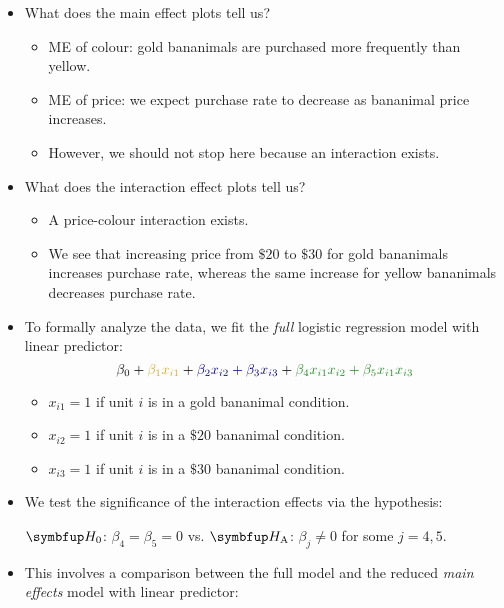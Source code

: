 \begin{itemize}
      \item What does the main effect plots tell us?
            \begin{itemize}
                  \item ME of colour: gold bananimals are purchased more frequently than yellow.
                  \item ME of price: we expect purchase rate to decrease as bananimal price increases.
                  \item However, we should not stop here because an interaction exists.
            \end{itemize}
      \item What does the interaction effect plots tell us?
            \begin{itemize}
                  \item A price-colour interaction exists.
                  \item We see that increasing price from $ \$20 $ to $ \$30 $ for gold bananimals increases purchase rate,
                        whereas the same increase for yellow bananimals decreases purchase rate.
            \end{itemize}
      \item To formally analyze the data, we fit the \emph{full} logistic regression model with linear predictor:
            \[ \beta_0+{\color{Goldenrod}\beta_1x_{i1}}+{\color{DarkBlue}\beta_2x_{i2}+\beta_3x_{i3}}+{\color{ForestGreen}\beta_4x_{i1}x_{i2}+\beta_5x_{i1}x_{i3}} \]
            \begin{itemize}
                  \item $ x_{i1}=1 $ if unit $ i $ is in a gold bananimal condition.
                  \item $ x_{i2}=1 $ if unit $ i $ is in a $ \$20 $ bananimal condition.
                  \item $ x_{i3}=1 $ if unit $ i $ is in a $ \$30 $ bananimal condition.
            \end{itemize}
      \item We test the significance of the interaction effects via the hypothesis:
            \begin{tightcenter}
                  {\color{ForestGreen}$ \HN $: $ \beta_4=\beta_5=0 $ vs. $ \HA $: $ \beta_j\ne 0 $ for some $ j=4,5 $.}
            \end{tightcenter}
      \item This involves a comparison between the full model and the reduced \emph{main effects} model with linear predictor:

\end{itemize}
